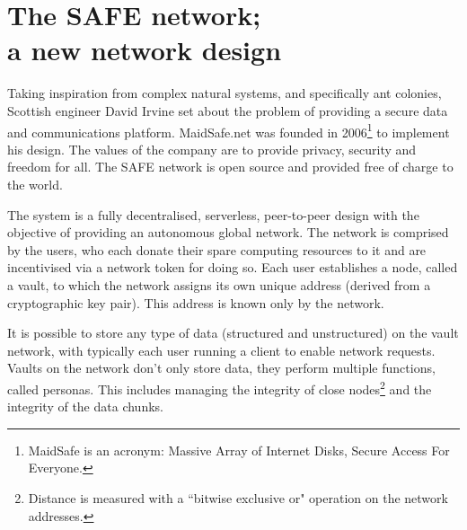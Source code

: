 \documentclass[twocolumn,english]{article}
\begin{document}
\section{The SAFE network; \\ a new network design}

Taking inspiration from complex natural systems, and specifically
ant colonies, Scottish engineer David Irvine set about the problem
of providing a secure data and communications platform. MaidSafe.net was founded in 2006\footnote{MaidSafe is an acronym: Massive Array of Internet Disks, Secure Access For Everyone.} to implement his design. The values of the company are to provide privacy, security and freedom for all.  The SAFE network is open source and provided free of charge to the world. %

The system is a fully decentralised, serverless, peer-to-peer design with
the objective of providing an autonomous global network. The network
is comprised by the users, who each donate their spare computing resources
to it and are incentivised via a network token for doing so. Each
user establishes a node, called a vault, to which the network assigns its
own unique address (derived from a cryptographic key pair). This address
is known only by the network.\cite{paulMS}

It is possible to store any type of data (structured and unstructured)
on the vault network, with typically each user running a client to enable
network requests. Vaults on the network don't
only store data, they perform multiple functions, called personas.
This includes managing the integrity of close nodes\footnote{Distance is measured with a ``bitwise exclusive or" operation on the network addresses.} and the integrity of the data chunks.  
\end{document}
